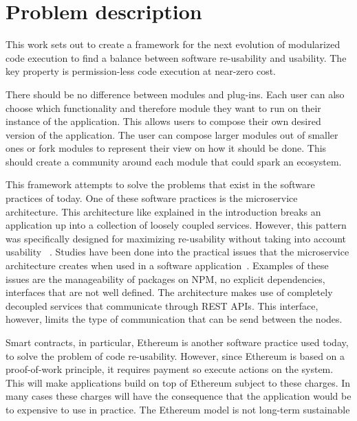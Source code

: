 \chapter{Problem description}


%

This work sets out to create a framework for the next evolution of modularized code execution to find a balance between software re-usability and usability. The key property is permission-less code execution at near-zero cost.

There should be no difference between modules and plug-ins. Each user can also choose which functionality and therefore module they want to run on their instance of the application. This allows users to compose their own desired version of the application. The user can compose larger modules out of smaller ones or fork modules to represent their view on how it should be done. This should create a community around each module that could spark an ecosystem.

This framework attempts to solve the problems that exist in the software practices of today. One of these software practices is the microservice architecture. This architecture like explained in the introduction breaks an application up into a collection of loosely coupled services. However, this pattern was specifically designed for maximizing re-usability without taking into account usability~\cite{newman2015building} . Studies have been done into the practical issues that the microservice architecture creates when used in a software application~\cite{dragoni2017microservices}. Examples of these issues are the manageability of packages on NPM, no explicit dependencies, interfaces that are not well defined. The architecture makes use of completely decoupled services that communicate through REST APIs. This interface, however, limits the type of communication that can be send between the nodes.

Smart contracts, in particular, Ethereum is another software practice used today, to solve the problem of code re-usability. However, since Ethereum is based on a proof-of-work principle, it requires payment so execute actions on the system. This will make applications build on top of Ethereum subject to these charges. In many cases these charges will have the consequence that the application would be to expensive to use in practice. The Ethereum model is not long-term sustainable

